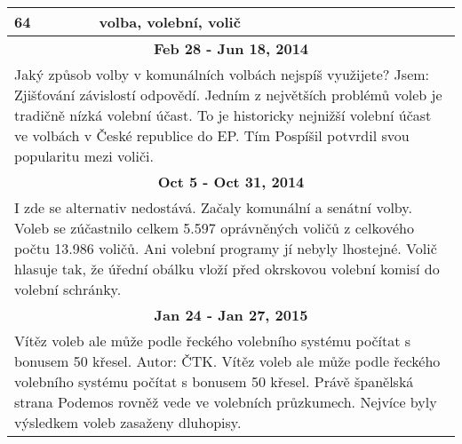 \begin{tabularx}{\linewidth}{l l}
\bf 64 & \bf volba, volební, volič \\ \midrule
\multicolumn{2}{c}{\bf Feb 28 - Jun 18, 2014} \\
\multicolumn{2}{p{\linewidth}}{Jaký způsob volby v komunálních volbách nejspíš využijete? Jsem: Zjišťování závislostí odpovědí. Jedním z největších problémů voleb je tradičně nízká volební účast. To je historicky nejnižší volební účast ve volbách v České republice do EP. Tím Pospíšil potvrdil svou popularitu mezi voliči.} \\ \midrule
\multicolumn{2}{c}{\bf Oct 5 - Oct 31, 2014} \\
\multicolumn{2}{p{\linewidth}}{I zde se alternativ nedostává. Začaly komunální a senátní volby. Voleb se zúčastnilo celkem 5.597 oprávněných voličů z celkového počtu 13.986 voličů. Ani volební programy jí nebyly lhostejné. Volič hlasuje tak, že úřední obálku vloží před okrskovou volební komisí do volební schránky.} \\ \midrule
\multicolumn{2}{c}{\bf Jan 24 - Jan 27, 2015} \\
\multicolumn{2}{p{\linewidth}}{Vítěz voleb ale může podle řeckého volebního systému počítat s bonusem 50 křesel. Autor: ČTK. Vítěz voleb ale může podle řeckého volebního systému počítat s bonusem 50 křesel. Právě španělská strana Podemos rovněž vede ve volebních průzkumech. Nejvíce byly výsledkem voleb zasaženy dluhopisy.} \\ \midrule[1.5pt]

\end{tabularx}